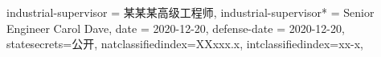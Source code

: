 {  %
  industrial-supervisor  = {某某某高级工程师},
  industrial-supervisor* = {Senior Engineer Carol Dave},
  date = {2020-12-20},
  defense-date = {2020-12-20},
  statesecrets={公开},
  natclassifiedindex={XXxxx.x},
  intclassifiedindex={xx-x},
}




\usepackage{threeparttable}

\usepackage{multirow}

\usepackage{siunitx}

\usepackage{amsthm}

\usepackage[sort&compress]{natbib}

% 


